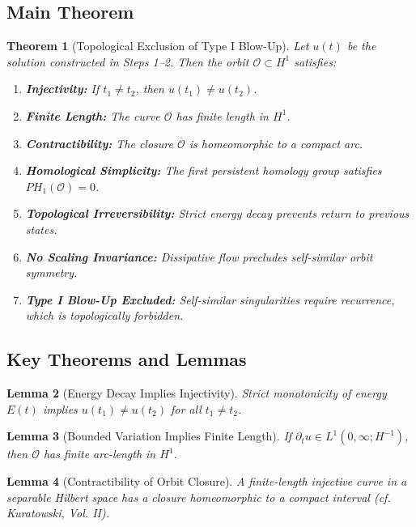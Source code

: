 \documentclass[11pt]{article}
\newtheorem{theorem}{Theorem}[section]
\newtheorem{lemma}[theorem]{Lemma}
\theoremstyle{definition}
\begin{document}
\subsection*{Main Theorem}
\begin{theorem}[Topological Exclusion of Type I Blow-Up]
Let \( u(t) \) be the solution constructed in Steps 1--2. Then the orbit \( \mathcal{O} \subset H^1 \) satisfies:
\begin{enumerate}
  \item \textbf{Injectivity:} If \( t_1 \ne t_2 \), then \( u(t_1) \ne u(t_2) \).
  \item \textbf{Finite Length:} The curve \( \mathcal{O} \) has finite length in \( H^1 \).
  \item \textbf{Contractibility:} The closure \( \overline{\mathcal{O}} \) is homeomorphic to a compact arc.
  \item \textbf{Homological Simplicity:} The first persistent homology group satisfies \( PH_1(\mathcal{O}) = 0 \).
  \item \textbf{Topological Irreversibility:} Strict energy decay prevents return to previous states.
  \item \textbf{No Scaling Invariance:} Dissipative flow precludes self-similar orbit symmetry.
  \item \textbf{Type I Blow-Up Excluded:} Self-similar singularities require recurrence, which is topologically forbidden.
\end{enumerate}
\end{theorem}

\subsection*{Key Theorems and Lemmas}
\begin{lemma}[Energy Decay Implies Injectivity]
Strict monotonicity of energy \( E(t) \) implies \( u(t_1) \ne u(t_2) \) for all \( t_1 \ne t_2 \).
\end{lemma}

\begin{lemma}[Bounded Variation Implies Finite Length]
If \( \partial_t u \in L^1(0,\infty; H^{-1}) \), then \( \mathcal{O} \) has finite arc-length in \( H^1 \).
\end{lemma}

\begin{lemma}[Contractibility of Orbit Closure]
A finite-length injective curve in a separable Hilbert space has a closure homeomorphic to a compact interval (cf. Kuratowski, Vol. II).
\end{lemma}
\end{document}
